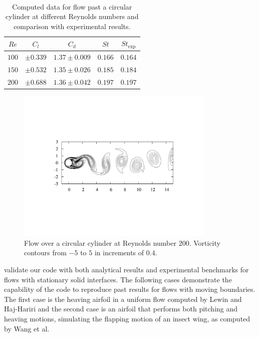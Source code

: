 \documentclass{tufte-handout}
\begin{document}
\begin{table}%
\  \centering
  \selectfont
	\begin{tabular} {c c c c c}
		\toprule
		$Re$ & $C_l$ & $C_d$ & $St$ & $St_{\text{exp}}$ \\
		\midrule
		$100$ & $\pm{0.339}$ & $1.37\pm{0.009}$ & $0.166$ & $0.164$\\
		
		$150$ & $\pm{0.532}$ & $1.35\pm{0.026}$ & $0.185$ & $0.184$\\
		
		$200$ & $\pm{0.688}$ & $1.36\pm{0.042}$ & $0.197$ & $0.197$\\
		\bottomrule
	\end{tabular}
	\caption{Computed data for flow past a circular cylinder at different Reynolds numbers and comparison with experimental results.}\vspace{0.3cm}
	\label{table:wakeresults}
\end{table}


\begin{figure}
\centering
	\includegraphics[width=0.85\textwidth]{figs/wakeRe200.pdf}
	\caption{Flow over a circular cylinder at Reynolds number $200$. Vorticity contours from $-5$ to $5$ in increments of $0.4$.}
\end{figure}


 validate our code with both analytical results and experimental benchmarks for flows with stationary solid interfaces. The following cases demonstrate the capability of the code to reproduce past results for flows with moving boundaries. The first case is the heaving airfoil in a uniform flow computed by Lewin and Haj-Hariri\cite{Lewin2003} and the second case is an airfoil that performs both pitching and heaving motions, simulating the flapping motion of an insect wing, as computed by Wang et al.\cite{WangETal2004}
\end{document}
